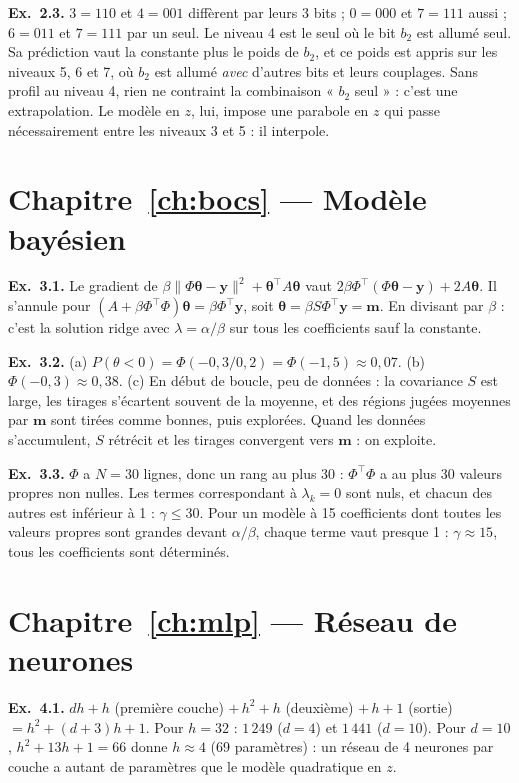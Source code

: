 \textbf{Ex.~2.3.} $3=110$ et $4=001$ diffèrent par leurs 3 bits ; $0=000$ et $7=111$ aussi ; $6=011$ et $7=111$ par un seul. Le niveau 4 est le seul où le bit $b_2$ est allumé seul. Sa prédiction vaut la constante plus le poids de $b_2$, et ce poids est appris sur les niveaux 5, 6 et 7, où $b_2$ est allumé \emph{avec} d'autres bits et leurs couplages. Sans profil au niveau 4, rien ne contraint la combinaison « $b_2$ seul » : c'est une extrapolation. Le modèle en $z$, lui, impose une parabole en $z$ qui passe nécessairement entre les niveaux 3 et 5 : il interpole.

\section*{Chapitre~\ref{ch:bocs} — Modèle bayésien}
\textbf{Ex.~3.1.} Le gradient de $\beta\|\Phi\boldsymbol\theta-\mathbf y\|^2+\boldsymbol\theta^\top A\boldsymbol\theta$ vaut $2\beta\Phi^\top(\Phi\boldsymbol\theta-\mathbf y)+2A\boldsymbol\theta$. Il s'annule pour $(A+\beta\Phi^\top\Phi)\boldsymbol\theta=\beta\Phi^\top\mathbf y$, soit $\boldsymbol\theta=\beta S\Phi^\top\mathbf y=\mathbf m$. En divisant par $\beta$ : c'est la solution ridge avec $\lambda=\alpha/\beta$ sur tous les coefficients sauf la constante.

\textbf{Ex.~3.2.} (a) $P(\theta<0)=\Phi(-0{,}3/0{,}2)=\Phi(-1{,}5)\approx0{,}07$. (b) $\Phi(-0{,}3)\approx0{,}38$. (c) En début de boucle, peu de données : la covariance $S$ est large, les tirages s'écartent souvent de la moyenne, et des régions jugées moyennes par $\mathbf m$ sont tirées comme bonnes, puis explorées. Quand les données s'accumulent, $S$ rétrécit et les tirages convergent vers $\mathbf m$ : on exploite.

\textbf{Ex.~3.3.} $\Phi$ a $N=30$ lignes, donc un rang au plus 30 : $\Phi^\top\Phi$ a au plus 30 valeurs propres non nulles. Les termes correspondant à $\lambda_k=0$ sont nuls, et chacun des autres est inférieur à 1 : $\gamma\le30$. Pour un modèle à 15 coefficients dont toutes les valeurs propres sont grandes devant $\alpha/\beta$, chaque terme vaut presque 1 : $\gamma\approx15$, tous les coefficients sont déterminés.

\section*{Chapitre~\ref{ch:mlp} — Réseau de neurones}
\textbf{Ex.~4.1.} $dh+h$ (première couche) $+\,h^2+h$ (deuxième) $+\,h+1$ (sortie) $=h^2+(d+3)h+1$. Pour $h=32$ : $1\,249$ ($d=4$) et $1\,441$ ($d=10$). Pour $d=10$, $h^2+13h+1=66$ donne $h\approx4$ (69 paramètres) : un réseau de 4 neurones par couche a autant de paramètres que le modèle quadratique en $z$.

